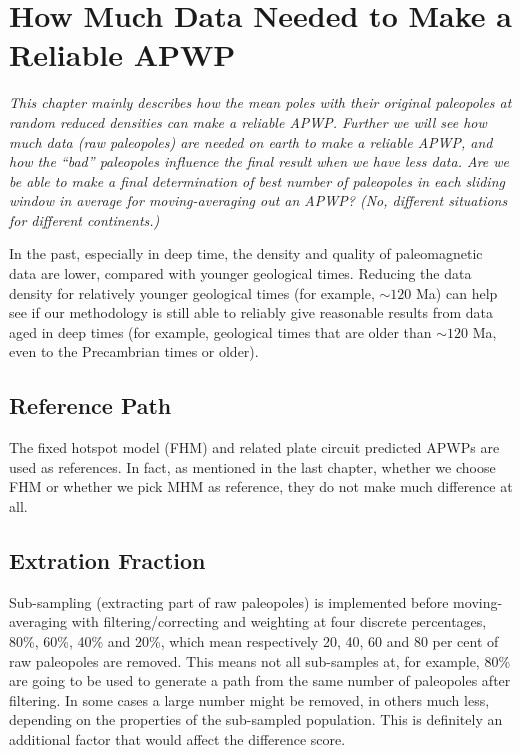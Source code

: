 \chapter{How Much Data Needed to Make a Reliable APWP}\label{chap:DatNeed}
\textit{This chapter mainly describes how the mean poles with their original
paleopoles at random reduced densities can make a reliable APWP\@. Further we
will see how much data (raw paleopoles) are needed on earth to make a reliable
APWP, and how the ``bad'' paleopoles influence the final result when we have
less data. Are we be able to make a final determination of best number of
paleopoles in each sliding window in average for moving-averaging out an APWP\@?
(No, different situations for different continents.)}
\vfill
\minitoc\newpage

In the past, especially in deep time, the density and quality of paleomagnetic
data are lower, compared with younger geological times. Reducing the data
density for relatively younger geological times (for example, ${\sim}120$
Ma) can help see if our methodology is still able to reliably give reasonable
results from data aged in deep times (for example, geological times that are
older than ${\sim}120$ Ma, even to the Precambrian times or older).

\section{Reference Path}

The fixed hotspot model (FHM) and related plate circuit predicted APWPs are used
as references. In fact, as mentioned in the last chapter, whether we choose FHM
or whether we pick MHM as reference, they do not make much difference at all.

\section{Extration Fraction}

Sub-sampling (extracting part of raw paleopoles) is implemented before
moving-averaging with filtering/correcting and weighting at four discrete
percentages, 80\%, 60\%, 40\% and 20\%, which mean respectively 20, 40, 60 and
80 per cent of raw paleopoles are removed. This means not all sub-samples at,
for example, 80\% are going to be used to generate a path from the same number
of paleopoles after filtering. In some cases a large number might be removed, in
others much less, depending on the properties of the sub-sampled population.
This is definitely an additional factor that would affect the difference score.


